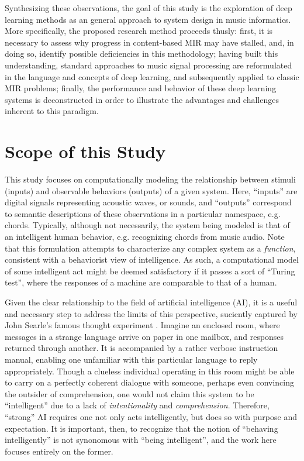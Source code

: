 Synthesizing these observations, the goal of this study is the exploration of deep learning methods as an general approach to system design in music informatics.
More specifically, the proposed research method proceeds thusly:
first, it is necessary to assess why progress in content-based MIR may have stalled, and, in doing so, identify possible deficiencies in this methodology;
having built this understanding, standard approaches to music signal processing are reformulated in the language and concepts of deep learning, and subsequently applied to classic MIR problems;
finally, the performance and behavior of these deep learning systems is deconstructed in order to illustrate the advantages and challenges inherent to this paradigm.


\section{Scope of this Study}
\label{sec:scope}

%

This study focuses on computationally modeling the relationship between stimuli (inputs) and observable behaviors (outputs) of a given system.
Here, ``inputs'' are digital signals representing acoustic waves, or sounds, and ``outputs'' correspond to semantic descriptions of these observations in a particular namespace, e.g. chords.
Typically, although not necessarily, the system being modeled is that of an intelligent human behavior, e.g. recognizing chords from music audio.
Note that this formulation attempts to characterize any complex system as a \emph{function}, consistent with a behaviorist view of intelligence.
As such, a computational model of some intelligent act might be deemed satisfactory if it passes a sort of ``Turing test'', where the responses of a machine are comparable to that of a human.

Given the clear relationship to the field of artificial intelligence (AI), it is a useful and necessary step to address the limits of this perspective, sucicntly captured by John Searle's famous thought experiment \cite{Searle1960?}.
Imagine an enclosed room, where messages in a strange language arrive on paper in one mailbox, and responses returned through another.
It is accompanied by a rather verbose instruction manual, enabling one unfamiliar with this particular language to reply appropriately.
Though a clueless individual operating in this room might be able to carry on a perfectly coherent dialogue with someone, perhaps even convincing the outsider of comprehension, one would not claim this system to be ``intelligent'' due to a lack of \emph{intentionality} and \emph{comprehension}.
Therefore, ``strong'' AI requires one not only acts intelligently, but does so with purpose and expectation.
It is important, then, to recognize that the notion of ``behaving intelligently'' is not synonomous with ``being intelligent'', and the work here focuses entirely on the former.

